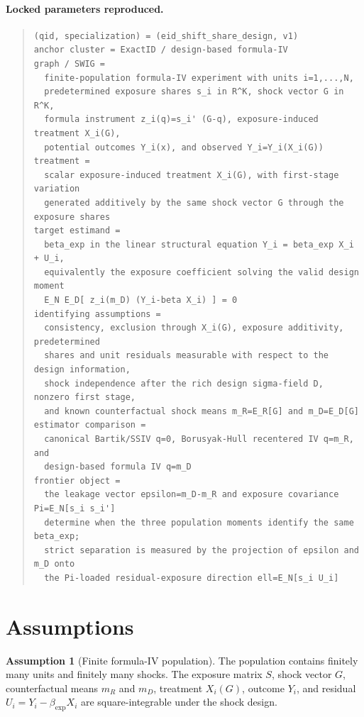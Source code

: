 \documentclass[11pt]{article}
\theoremstyle{definition}
\newtheorem{assumption}{Assumption}
\theoremstyle{plain}
\theoremstyle{remark}
\begin{document}
\paragraph{Locked parameters reproduced.}
\begin{quote}\small
\begin{verbatim}
(qid, specialization) = (eid_shift_share_design, v1)
anchor cluster = ExactID / design-based formula-IV
graph / SWIG =
  finite-population formula-IV experiment with units i=1,...,N,
  predetermined exposure shares s_i in R^K, shock vector G in R^K,
  formula instrument z_i(q)=s_i' (G-q), exposure-induced treatment X_i(G),
  potential outcomes Y_i(x), and observed Y_i=Y_i(X_i(G))
treatment =
  scalar exposure-induced treatment X_i(G), with first-stage variation
  generated additively by the same shock vector G through the exposure shares
target estimand =
  beta_exp in the linear structural equation Y_i = beta_exp X_i + U_i,
  equivalently the exposure coefficient solving the valid design moment
  E_N E_D[ z_i(m_D) (Y_i-beta X_i) ] = 0
identifying assumptions =
  consistency, exclusion through X_i(G), exposure additivity, predetermined
  shares and unit residuals measurable with respect to the design information,
  shock independence after the rich design sigma-field D, nonzero first stage,
  and known counterfactual shock means m_R=E_R[G] and m_D=E_D[G]
estimator comparison =
  canonical Bartik/SSIV q=0, Borusyak-Hull recentered IV q=m_R, and
  design-based formula IV q=m_D
frontier object =
  the leakage vector epsilon=m_D-m_R and exposure covariance Pi=E_N[s_i s_i']
  determine when the three population moments identify the same beta_exp;
  strict separation is measured by the projection of epsilon and m_D onto
  the Pi-loaded residual-exposure direction ell=E_N[s_i U_i]
\end{verbatim}
\end{quote}

\section{Assumptions}
\begin{assumption}[Finite formula-IV population]\label{ass:finite-formula}
The population contains finitely many units and finitely many shocks.  The exposure matrix \(S\), shock vector \(G\), counterfactual means \(m_R\) and \(m_D\), treatment \(X_i(G)\), outcome \(Y_i\), and residual \(U_i=Y_i-\beta_{\exp}X_i\) are square-integrable under the shock design.
\end{assumption}
\end{document}
